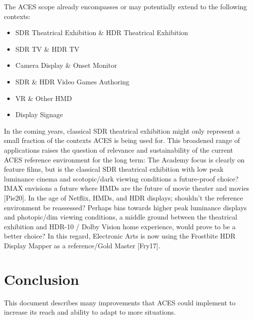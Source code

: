 \documentclass[conference]{IEEEtran}
\begin{document}
The ACES scope already encompasses or may potentially extend to the following contexts:
\begin{itemize}
    \item SDR Theatrical Exhibition \& HDR Theatrical Exhibition
    \item SDR TV \& HDR TV
    \item Camera Display \& Onset Monitor
    \item SDR \& HDR Video Games Authoring
    \item VR \& Other HMD
    \item Display Signage
\end{itemize}

In the coming years, classical SDR theatrical exhibition might only represent a small fraction of the contexts ACES is being used for. This broadened range of applications raises the question of relevance and sustainability of the current ACES reference environment for the long term: The Academy focus is clearly on feature films, but is the classical SDR theatrical exhibition with low peak luminance cinema and scotopic/dark viewing conditions a future-proof choice? IMAX envisions a future where HMDs are the future of movie theater and movies [Pie20]. In the age of Netflix, HMDs, and HDR displays; shouldn't the reference environment be reassessed? Perhaps bias towards higher peak luminance displays and photopic/dim viewing conditions, a middle ground between the theatrical exhibition and HDR-10 / Dolby Vision home experience, would prove to be a better choice? In this regard, Electronic Arts is now using the Frostbite HDR Display Mapper as a reference/Gold Master [Fry17].

\section{Conclusion}
This document describes many improvements that ACES could implement to increase its reach and ability to adapt to more situations.
\end{document}
